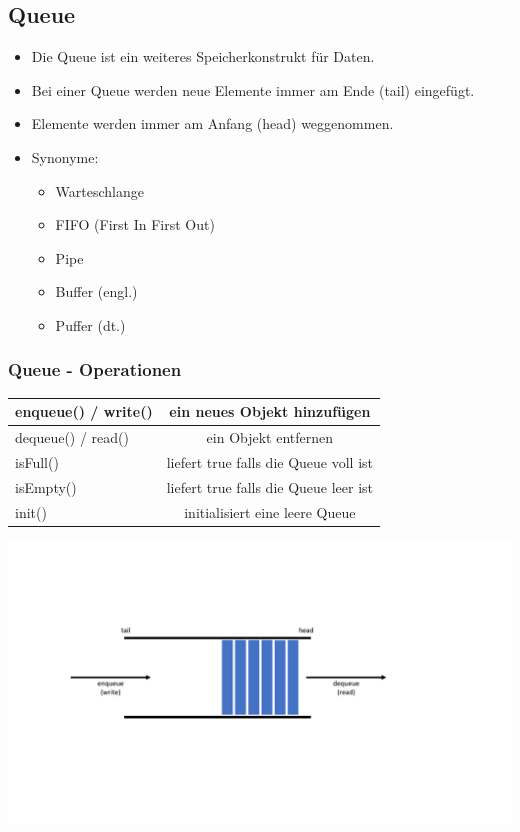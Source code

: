 \begin{multicols}{2}
	\subsection{Queue}
	\begin{itemize}
		\item Die Queue ist ein weiteres Speicherkonstrukt für Daten.
		\item Bei einer Queue werden neue Elemente immer am Ende (tail) eingefügt.
		\item Elemente werden immer am Anfang (head) weggenommen.
		\item Synonyme:
		\begin{itemize}
			\item Warteschlange
			\item FIFO (First In First Out)
			\item Pipe
			\item Buffer (engl.)
			\item Puffer (dt.)
		\end{itemize}
	\end{itemize}
	\vfill\null
	\columnbreak
	\subsubsection{Queue - Operationen}
	\begin{tabular}{lc}
		enqueue() / write() & ein neues Objekt hinzufügen \\ 
		\hline 
		dequeue() / read() & ein Objekt entfernen \\ 
		\hline 
		isFull() & liefert true falls die Queue voll ist \\ 
		\hline 
		isEmpty() & liefert true falls die Queue leer ist \\ 
		init() & initialisiert eine leere Queue \\ 
	\end{tabular}
	\begin{minipage}{0.7\linewidth}
		\includegraphics[width=\linewidth]{images/klasse2.pdf}
	\end{minipage}
\end{multicols}